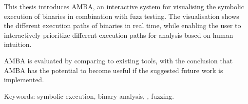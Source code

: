 This thesis introduces AMBA, an interactive system for visualising
the symbolic execution of binaries in combination with fuzz testing. The
visualisation shows the different execution paths of binaries in real time,
while enabling the user to interactively prioritize different execution
paths for analysis based on human intuition.

AMBA is evaluated by comparing to existing tools, with the conclusion
that AMBA has the potential to become useful if the suggested future work is
implemented.

Keywords: symbolic execution, binary analysis, \stoe{}, fuzzing.
